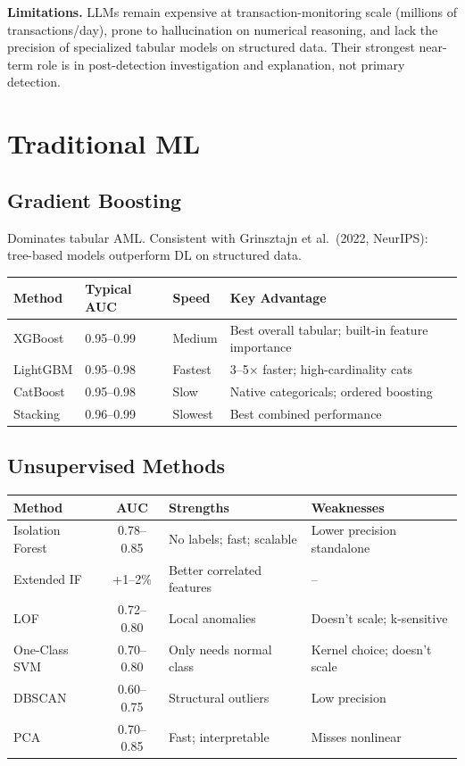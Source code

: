 \documentclass[11pt]{article}
\begin{document}
\textbf{Limitations.} LLMs remain expensive at transaction-monitoring scale (millions of transactions/day), prone to hallucination on numerical reasoning, and lack the precision of specialized tabular models on structured data. Their strongest near-term role is in post-detection investigation and explanation, not primary detection.

\section{Traditional ML}

\subsection{Gradient Boosting}

Dominates tabular AML. Consistent with Grinsztajn et al.\ (2022, NeurIPS): tree-based models outperform DL on structured data.

\begin{center}
\small
\begin{tabular}{llll}
\toprule
\textbf{Method} & \textbf{Typical AUC} & \textbf{Speed} & \textbf{Key Advantage} \\
\midrule
XGBoost & 0.95--0.99 & Medium & Best overall tabular; built-in feature importance \\
LightGBM & 0.95--0.98 & Fastest & 3--5$\times$ faster; high-cardinality cats \\
CatBoost & 0.95--0.98 & Slow & Native categoricals; ordered boosting \\
Stacking & 0.96--0.99 & Slowest & Best combined performance \\
\bottomrule
\end{tabular}
\end{center}

\subsection{Unsupervised Methods}

\begin{center}
\small
\begin{tabular}{lcll}
\toprule
\textbf{Method} & \textbf{AUC} & \textbf{Strengths} & \textbf{Weaknesses} \\
\midrule
Isolation Forest & 0.78--0.85 & No labels; fast; scalable & Lower precision standalone \\
Extended IF & +1--2\% & Better correlated features & -- \\
LOF & 0.72--0.80 & Local anomalies & Doesn't scale; k-sensitive \\
One-Class SVM & 0.70--0.80 & Only needs normal class & Kernel choice; doesn't scale \\
DBSCAN & 0.60--0.75 & Structural outliers & Low precision \\
PCA & 0.70--0.85 & Fast; interpretable & Misses nonlinear \\
\bottomrule
\end{tabular}
\end{center}
\end{document}
